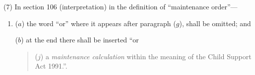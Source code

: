 \documentclass[12pt,a4paper]{article}
\begin{document}
(7) In section 106 (interpretation) in the definition of “maintenance order”—
\begin{enumerate}\item[]
($a$) the word “or” where it appears after paragraph ($g$), shall be omitted; and

($b$) at the end there shall be inserted “or
\begin{quotation}
($j$) a 
\emph{maintenance calculation}  %
within the meaning of the Child Support Act 1991.”.
\end{quotation}
\end{enumerate}
\end{document}

